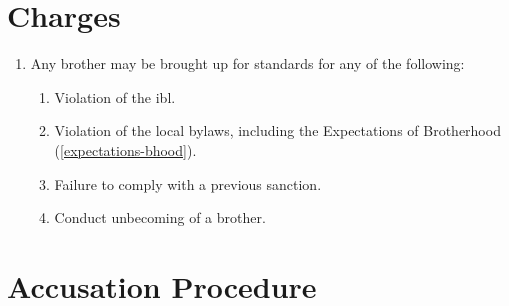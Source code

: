 \section{Charges}

	\begin{enumerate}
		\item Any brother may be brought up for standards for any of the following:
		
		\begin{enumerate}
			\item Violation of the \gls{ibl}.
			\item Violation of the local bylaws, including the Expectations of Brotherhood (\autoref{expectations-bhood}).
			\item Failure to comply with a previous sanction.
			\item Conduct unbecoming of a brother.
		\end{enumerate}

	\end{enumerate}

\section{Accusation Procedure}

